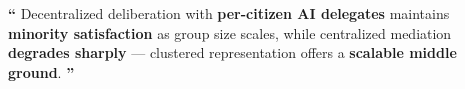 \documentclass{article}
\newcommand{\mainfindingspacing}{1.3}    %
\newlength{\panelmargin}
\begin{document}
\noindent
\colorbox{pivotalSnow}{%
  \parbox[t]{\dimexpr\paperwidth-2\fboxsep\relax}{%
    \color{pivotalNight}
    \vspace{1.5cm}
    \hspace{\panelmargin}
    \begin{minipage}[t]{\dimexpr\paperwidth-2\panelmargin-2\fboxsep\relax}
      \begin{flushleft}
        {\fontsize{72}{72}\selectfont\textbf{\textcolor{pivotalBlue}{``}}}%
        {\fontsize{36}{46}\selectfont
        \renewcommand{\baselinestretch}{\mainfindingspacing}\selectfont
        Decentralized deliberation with \textbf{per-citizen AI delegates} maintains
        \textbf{minority satisfaction} as group size scales, while centralized
        mediation \textbf{degrades sharply} --- clustered representation offers
        a \textbf{scalable middle ground}.}%
        {\fontsize{72}{72}\selectfont\textbf{\textcolor{pivotalBlue}{''}}}
      \end{flushleft}
    \vspace{1cm}
    \end{minipage}
  }%
}

\vspace{0pt}
\end{document}
